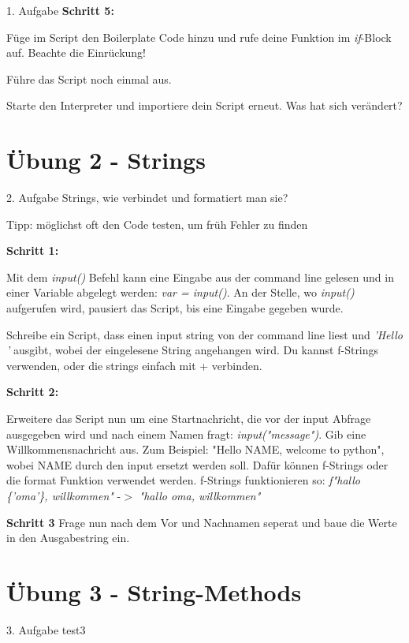 \begin{frame}{1. Aufgabe}
	\textbf{Schritt 5:}
	
	Füge im Script den Boilerplate Code hinzu und rufe deine Funktion im \textit{if}-Block auf. Beachte die Einrückung!
	
	
	
	Führe das Script noch einmal aus.
	
	Starte den Interpreter und importiere dein Script erneut. Was hat sich verändert?
\end{frame}

\section{Übung 2 - Strings}

\begin{frame}{2. Aufgabe}
	Strings, wie verbindet und formatiert man sie?
	
	Tipp: möglichst oft den Code testen, um früh Fehler zu finden
	
	\textbf{Schritt 1:}
	
	Mit dem \textit{input()} Befehl kann eine Eingabe aus der command line gelesen und in einer Variable abgelegt werden: \textit{var = input()}. An der Stelle, wo \textit{input()} aufgerufen wird, pausiert das Script, bis eine Eingabe gegeben wurde.
	
	Schreibe ein Script, dass einen input string von der command line liest und \textit{'Hello '} ausgibt, wobei der eingelesene String angehangen wird. Du kannst f-Strings verwenden, oder die strings einfach mit + verbinden.
\end{frame}
\begin{frame}
	\textbf{Schritt 2:}
	
	Erweitere das Script nun um eine Startnachricht, die vor der input Abfrage ausgegeben wird und nach einem Namen fragt: \textit{input("message")}. Gib eine Willkommensnachricht aus. Zum Beispiel: "Hello NAME, welcome to python", wobei NAME durch den input ersetzt werden soll. Dafür können f-Strings oder die format Funktion verwendet werden.
	\linebreak
	f-Strings funktionieren so: \textit{f"hallo \{'oma'\}, willkommen"} -$>$ \textit{"hallo oma, willkommen"}
	\linebreak
	
	\textbf{Schritt 3}	
	Frage nun nach dem Vor und Nachnamen seperat und baue die Werte in den Ausgabestring ein.
\end{frame}


\section{Übung 3 - String-Methods}

\begin{frame}{3. Aufgabe}
	test3
\end{frame}



